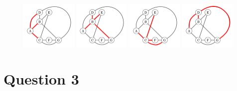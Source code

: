 \documentclass[12pt]{article}
\begin{document}
\begin{enumerate}[a.]
    \begin{figure}
        \includegraphics[width=0.24\textwidth]{images/worksheet_19_q2b1_solution.png}\hfill
        \includegraphics[width=0.24\textwidth]{images/worksheet_19_q2b2_solution.png}\hfill
        \includegraphics[width=0.24\textwidth]{images/worksheet_19_q2b3_solution.png}\hfill
        \includegraphics[width=0.24\textwidth]{images/worksheet_19_q2b4_solution.png}\hfill
    \end{figure}
\end{enumerate}

\section*{Question 3}
\end{document}
